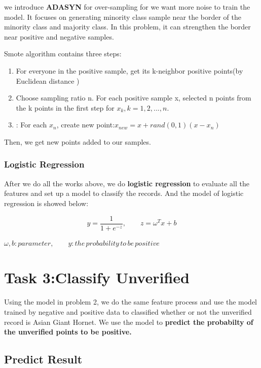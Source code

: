 \documentclass[12pt]{article}
\begin{document}
we introduce \textbf{ADASYN }for over-sampling for we want more noise to train the model. It focuses on generating minority class sample near the border of the minority class and majority class. In this problem, it can strengthen the border near positive and negative samples.


Smote algorithm contains three steps:
\begin{enumerate}
	\item For everyone in the positive sample, get its k-neighbor positive points(by Euclidean distance )
	\item Choose sampling ratio n. For each positive sample x, selected n points from the k points in the first step for $x_k,k=1,2,...,n$. 
	\item: For each $x_n$, create new point:$x_{new}=x+rand(0,1)(x-x_n)$
\end{enumerate}

Then, we get new points added to our samples.

\subsubsection{Logistic Regression}
After we do all the works above, we do \textbf{logistic regression} to evaluate all the features and set up a model to classify the records. And the model of logistic regression is showed below:

\begin{equation}
y=\frac{1}{1+e^{-z}},\qquad z=\omega^Tx+b 
\end{equation}
\begin{center}
	$\omega,b:parameter,\qquad y:the\, probability\, to \,be\, positive$
\end{center}

\section{Task 3:Classify Unverified}
Using the model in problem 2, we do the same feature process and use the model trained by negative and positive data to classified whether or not the unverified record is Asian Giant Hornet. We use the model to \textbf{predict the probabilty of the unverified points to be positive.}
\subsection{Predict Result}
\end{document}
